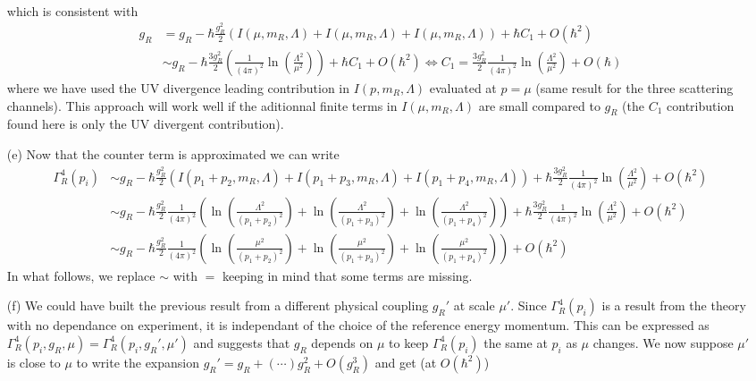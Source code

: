 \documentclass[10pt, a4paper]{article}
\begin{document}
\begin{enumerate}
\begin{align*}
  \end{align*}
  which is consistent with 
  \begin{align*}
    g_R &= g_R - \hbar \frac{g_R^2}{2}\left(I(\mu, m_R, \Lambda) + I(\mu, m_R, \Lambda) + I(\mu, m_R, \Lambda)\right) + \hbar C_1 + O(\hbar^2)\\
    &\sim g_R - \hbar \frac{3 g_R^2}{2}\left(\frac{1}{(4\pi)^2}\ln\left(\frac{\Lambda^2}{\mu^2}\right)\right) + \hbar C_1 + O(\hbar^2) \iff C_1 = \frac{3 g_R^2}{2}\frac{1}{(4\pi)^2}\ln\left(\frac{\Lambda^2}{\mu^2}\right) + O(\hbar)
  \end{align*}
  where we have used the UV divergence leading contribution in $I(p, m_R, \Lambda)$ evaluated at $p = \mu$ (same result for the three scattering channels). This approach will work well if the aditionnal finite terms in $I(\mu, m_R, \Lambda)$ are small compared to $g_R$ (the $C_1$ contribution found here is only the UV divergent contribution).
  \item[(e)] Now that the counter term is approximated we can write 
  \begin{align*}
    \Gamma^{4}_R(p_i) &\sim g_R - \hbar \frac{g_R^2}{2}\left(I(p_1 + p_2, m_R, \Lambda) + I(p_1 + p_3, m_R, \Lambda) + I(p_1 + p_4, m_R, \Lambda)\right) + \hbar \frac{3 g_R^2}{2}\frac{1}{(4\pi)^2}\ln\left(\frac{\Lambda^2}{\mu^2}\right) + O(\hbar^2)\\
    &\sim g_R - \hbar \frac{g_R^2}{2}\frac{1}{(4\pi)^2}\left(\ln\left(\frac{\Lambda^2}{(p_1 + p_2)^2}\right) + \ln\left(\frac{\Lambda^2}{(p_1 + p_3)^2}\right) + \ln\left(\frac{\Lambda^2}{(p_1 + p_4)^2}\right) \right)+ \hbar \frac{3 g_R^2}{2}\frac{1}{(4\pi)^2}\ln\left(\frac{\Lambda^2}{\mu^2}\right) + O(\hbar^2)\\
    &\sim g_R - \hbar \frac{g_R^2}{2}\frac{1}{(4\pi)^2}\left(\ln\left(\frac{\mu^2}{(p_1 + p_2)^2}\right) + \ln\left(\frac{\mu^2}{(p_1 + p_3)^2}\right) + \ln\left(\frac{\mu^2}{(p_1 + p_4)^2}\right) \right) + O(\hbar^2)
  \end{align*}
  In what follows, we replace $\sim$ with $=$ keeping in mind that some terms are missing. 
  \item[(f)] We could have built the previous result from a different physical coupling $g_R'$ at scale $\mu'$. Since $\Gamma^{4}_R(p_i)$ is a result from the theory with no dependance on experiment, it is independant of the choice of the reference energy momentum.  This can be expressed as $\Gamma^{4}_R(p_i, g_R, \mu) = \Gamma^{4}_R(p_i, g_R', \mu')$ and suggests that $g_R$ depends on $\mu$ to keep $\Gamma^{4}_R(p_i)$ the same at $p_i$ as $\mu$ changes. We now suppose $\mu'$ is close to $\mu$ to write the expansion $g_R' = g_R + (\cdots) g_R^2 + O(g_R^3)$ and get (at $O(\hbar^2)$)

\end{enumerate}
\end{document}
